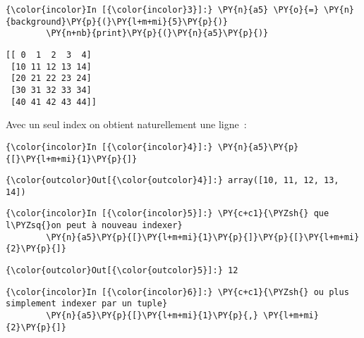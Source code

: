     \begin{Verbatim}[commandchars=\\\{\},frame=single,framerule=0.3mm,rulecolor=\color{cellframecolor}]
{\color{incolor}In [{\color{incolor}3}]:} \PY{n}{a5} \PY{o}{=} \PY{n}{background}\PY{p}{(}\PY{l+m+mi}{5}\PY{p}{)}
        \PY{n+nb}{print}\PY{p}{(}\PY{n}{a5}\PY{p}{)}
\end{Verbatim}


    \begin{Verbatim}[commandchars=\\\{\},frame=single,framerule=0.3mm,rulecolor=\color{cellframecolor}]
[[ 0  1  2  3  4]
 [10 11 12 13 14]
 [20 21 22 23 24]
 [30 31 32 33 34]
 [40 41 42 43 44]]
\end{Verbatim}

    Avec un seul index on obtient naturellement une ligne~:

    \begin{Verbatim}[commandchars=\\\{\},frame=single,framerule=0.3mm,rulecolor=\color{cellframecolor}]
{\color{incolor}In [{\color{incolor}4}]:} \PY{n}{a5}\PY{p}{[}\PY{l+m+mi}{1}\PY{p}{]}
\end{Verbatim}


\begin{Verbatim}[commandchars=\\\{\},frame=single,framerule=0.3mm,rulecolor=\color{cellframecolor}]
{\color{outcolor}Out[{\color{outcolor}4}]:} array([10, 11, 12, 13, 14])
\end{Verbatim}
            
    \begin{Verbatim}[commandchars=\\\{\},frame=single,framerule=0.3mm,rulecolor=\color{cellframecolor}]
{\color{incolor}In [{\color{incolor}5}]:} \PY{c+c1}{\PYZsh{} que l\PYZsq{}on peut à nouveau indexer}
        \PY{n}{a5}\PY{p}{[}\PY{l+m+mi}{1}\PY{p}{]}\PY{p}{[}\PY{l+m+mi}{2}\PY{p}{]}
\end{Verbatim}


\begin{Verbatim}[commandchars=\\\{\},frame=single,framerule=0.3mm,rulecolor=\color{cellframecolor}]
{\color{outcolor}Out[{\color{outcolor}5}]:} 12
\end{Verbatim}
            
    \begin{Verbatim}[commandchars=\\\{\},frame=single,framerule=0.3mm,rulecolor=\color{cellframecolor}]
{\color{incolor}In [{\color{incolor}6}]:} \PY{c+c1}{\PYZsh{} ou plus simplement indexer par un tuple}
        \PY{n}{a5}\PY{p}{[}\PY{l+m+mi}{1}\PY{p}{,} \PY{l+m+mi}{2}\PY{p}{]}
\end{Verbatim}


